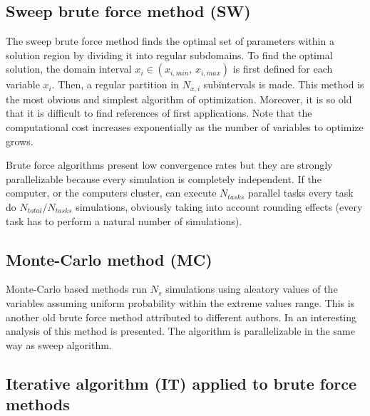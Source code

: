 \documentclass[review,authoryear]{elsarticle}
\newcommand{\PA}[1]{\left(#1\right)}
\begin{document}
\subsection{Sweep brute force method (SW)}

The sweep brute force method finds the optimal set of parameters within a solution region by dividing it into regular subdomains. To find the optimal solution, the domain interval $x_i \in \PA{x_{i,min},\,x_{i,max}}$ is first defined for each variable $x_i$. Then, a regular partition in  $N_{x,i}$ subintervals is made. This method is the most obvious and simplest algorithm of optimization. Moreover, it is so old that it is difficult to find references of first applications. Note that the computational cost increases exponentially as the number of variables to optimize grows.

Brute force algorithms present low convergence rates but they are strongly
parallelizable because every simulation is completely independent. If the
computer, or the computers cluster, can execute $N_{tasks}$ parallel tasks
every task do $N_{total}/N_{tasks}$ simulations, obviously taking into account
rounding effects (every task has to perform a natural number of simulations).

\subsection{Monte-Carlo method (MC)}

Monte-Carlo based methods run $N_s$ simulations using aleatory values of the
variables assuming uniform probability within the extreme values range. This is
another old brute force method attributed to different authors. In
\citet{AtanassovDimov08} an interesting analysis of this method is presented.
The algorithm is parallelizable in the same way as sweep algorithm.

\subsection{Iterative algorithm (IT) applied to brute force methods}
\end{document}
